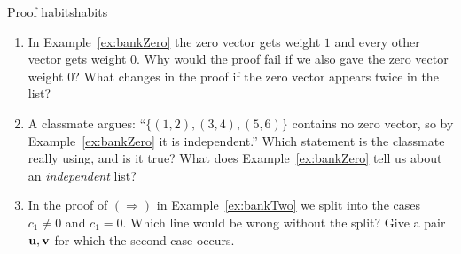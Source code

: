 \documentclass[11pt]{article}
\begin{document}
\begin{think}{Proof habits}{habits}
\begin{enumerate}[label=(\arabic*)]
  \item In Example~\ref{ex:bankZero} the zero vector gets weight $1$ and every other vector gets weight $0$. Why would the proof fail if we also gave the zero vector weight $0$? What changes in the proof if the zero vector appears twice in the list?
  \item A classmate argues: ``$\{(1,2),(3,4),(5,6)\}$ contains no zero vector, so by Example~\ref{ex:bankZero} it is independent.'' Which statement is the classmate really using, and is it true? What does Example~\ref{ex:bankZero} tell us about an \emph{independent} list?
  \item In the proof of $(\Rightarrow)$ in Example~\ref{ex:bankTwo} we split into the cases $c_1\neq0$ and $c_1=0$. Which line would be wrong without the split? Give a pair $\mathbf{u},\mathbf{v}$ for which the second case occurs.
\end{enumerate}
\end{think}
\end{document}
